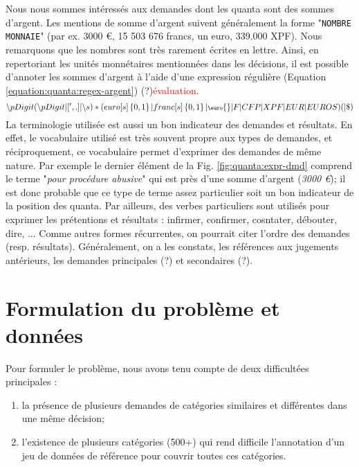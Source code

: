 Nous nous sommes intéressés aux demandes dont les quanta sont des sommes d'argent. Les mentions de somme d'argent suivent généralement la forme "\verb=NOMBRE MONNAIE=" (par ex. 3000 \euro{}, 15 503 676 francs, un euro, 339.000 XPF). Nous remarquons que les nombres sont très rarement écrites en lettre. Ainsi, en repertoriant les unités monnétaires mentionnées dans les décisions, il est possible d'annoter les sommes d'argent à l'aide d'une expression régulière (Equation \ref{equation:quanta:regex-argent}) (?)\textcolor{red}{évaluation}.
\begin{equation} \scriptsize
    \backslash p{Digit}(\backslash p{Digit}|[',.]|\backslash s)*(euro[s]\left\{0,1\right\}|franc[s]\left\{0,1\right\}|\euro{}|F|CFP|XPF|EUR|EUROS)( |\$)\label{equation:quanta:regex-argent}
\end{equation}
La terminologie utilisée est aussi un bon indicateur des demandes et résultats. En effet, le vocabulaire utilisé est très souvent propre aux types de demandes, et réciproquement, ce vocabulaire permet d'exprimer des demandes de même nature. Par exemple le dernier élément de la Fig. \ref{fig:quanta:expr-dmd} comprend le terme "\textit{pour procédure abusive}" qui est près d'une somme d'argent (\textit{3000 \euro{}}); il est donc probable que ce type de terme assez particulier soit un bon indicateur de la position des quanta. Par ailleurs, des verbes particuliers sont utilisés pour exprimer les prétentions et résultats : infirmer, confirmer, cosntater, débouter, dire, ... Comme autres formes récurrentes, on pourrait citer l'ordre des demandes (resp. résultats). Généralement, on a les constats, les références aux jugements antérieurs, les demandes principales (?) et secondaires (?).

\section{Formulation du problème et données}
\label{sec:quanta:formulation}
Pour formuler le problème, nous avons tenu compte de deux difficultées principales :
\begin{enumerate}
    \item la présence de plusieurs demandes de catégories similaires et différentes dans une même décision;
    \item l'existence de plusieurs catégories (500+) qui rend difficile l'annotation d'un jeu de données de référence pour couvrir toutes ces catégories.
\end{enumerate}

